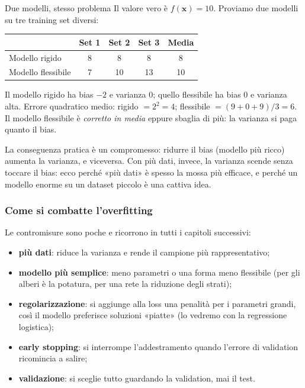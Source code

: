 \documentclass[12pt]{extarticle}
\begin{document}
\begin{esempiobox}{Due modelli, stesso problema}
Il valore vero è $f(\mathbf{x})=10$. Proviamo due modelli su tre training set diversi:
\smallskip
\begin{center}
\small
\begin{tabular}{@{}lcccc@{}}
\toprule
 & \textbf{Set 1} & \textbf{Set 2} & \textbf{Set 3} & \textbf{Media} \\
\midrule
Modello rigido     & 8  & 8  & 8  & 8  \\
Modello flessibile & 7  & 10 & 13 & 10 \\
\bottomrule
\end{tabular}
\end{center}
\smallskip
Il modello rigido ha bias $-2$ e varianza $0$; quello flessibile ha bias $0$ e varianza alta. Errore quadratico medio: rigido $= 2^2 = 4$; flessibile $= (9+0+9)/3 = 6$. Il modello flessibile è \emph{corretto in media} eppure sbaglia di più: la varianza si paga quanto il bias.
\end{esempiobox}

\noindent La conseguenza pratica è un compromesso: ridurre il bias (modello più ricco) aumenta la varianza, e viceversa. Con più dati, invece, la varianza scende senza toccare il bias: ecco perché «più dati» è spesso la mossa più efficace, e perché un modello enorme su un dataset piccolo è una cattiva idea.

\subsubsection{Come si combatte l'overfitting}

\noindent Le contromisure sono poche e ricorrono in tutti i capitoli successivi:
\begin{itemize}
    \item \textbf{più dati}: riduce la varianza e rende il campione più rappresentativo;
    \item \textbf{modello più semplice}: meno parametri o una forma meno flessibile (per gli alberi è la potatura, per una rete la riduzione degli strati);
    \item \textbf{regolarizzazione}: si aggiunge alla loss una penalità per i parametri grandi, così il modello preferisce soluzioni «piatte» (lo vedremo con la regressione logistica);
    \item \textbf{early stopping}: si interrompe l'addestramento quando l'errore di validation ricomincia a salire;
    \item \textbf{validazione}: si sceglie tutto guardando la validation, mai il test.
\end{itemize}
\end{document}

